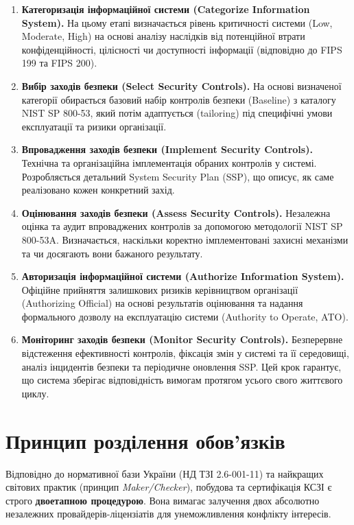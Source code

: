 \begin{enumerate}
    \item \textbf{Категоризація інформаційної системи (Categorize Information System).} На цьому етапі визначається рівень критичності системи (Low, Moderate, High) на основі аналізу наслідків від потенційної втрати конфіденційності, цілісності чи доступності інформації (відповідно до FIPS 199 та FIPS 200).
    \item \textbf{Вибір заходів безпеки (Select Security Controls).} На основі визначеної категорії обирається базовий набір контролів безпеки (Baseline) з каталогу NIST SP 800-53, який потім адаптується (tailoring) під специфічні умови експлуатації та ризики організації.
    \item \textbf{Впровадження заходів безпеки (Implement Security Controls).} Технічна та організаційна імплементація обраних контролів у системі. Розробляється детальний System Security Plan (SSP), що описує, як саме реалізовано кожен конкретний захід.
    \item \textbf{Оцінювання заходів безпеки (Assess Security Controls).} Незалежна оцінка та аудит впроваджених контролів за допомогою методології NIST SP 800-53A. Визначається, наскільки коректно імплементовані захисні механізми та чи досягають вони бажаного результату.
    \item \textbf{Авторизація інформаційної системи (Authorize Information System).} Офіційне прийняття залишкових ризиків керівництвом організації (Authorizing Official) на основі результатів оцінювання та надання формального дозволу на експлуатацію системи (Authority to Operate, ATO).
    \item \textbf{Моніторинг заходів безпеки (Monitor Security Controls).} Безперервне відстеження ефективності контролів, фіксація змін у системі та її середовищі, аналіз інцидентів безпеки та періодичне оновлення SSP. Цей крок гарантує, що система зберігає відповідність вимогам протягом усього свого життєвого циклу.
\end{enumerate}

\section{Принцип розділення обов'язків}

Відповідно до нормативної бази України (НД ТЗІ 2.6-001-11) та найкращих світових практик
(принцип \emph{Maker/Checker}), побудова та сертифікація КСЗІ є строго \textbf{двоетапною
процедурою}. Вона вимагає залучення двох абсолютно незалежних провайдерів-ліцензіатів для
унеможливлення конфлікту інтересів.


